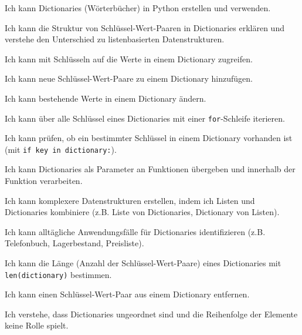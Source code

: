 \begin{todolist}
    \item Ich kann Dictionaries (Wörterbücher) in Python erstellen und verwenden.
    \item Ich kann die Struktur von Schlüssel-Wert-Paaren in Dictionaries erklären und verstehe den Unterschied zu listenbasierten Datenstrukturen.
    \item Ich kann mit Schlüsseln auf die Werte in einem Dictionary zugreifen.
    \item Ich kann neue Schlüssel-Wert-Paare zu einem Dictionary hinzufügen.
    \item Ich kann bestehende Werte in einem Dictionary ändern.
    \item Ich kann über alle Schlüssel eines Dictionaries mit einer \lstinline|for|-Schleife iterieren.
    \item Ich kann prüfen, ob ein bestimmter Schlüssel in einem Dictionary vorhanden ist (mit \lstinline|if key in dictionary:|).
    \item Ich kann Dictionaries als Parameter an Funktionen übergeben und innerhalb der Funktion verarbeiten.
    \item Ich kann komplexere Datenstrukturen erstellen, indem ich Listen und Dictionaries kombiniere (z.B. Liste von Dictionaries, Dictionary von Listen).
    \item Ich kann alltägliche Anwendungsfälle für Dictionaries identifizieren (z.B. Telefonbuch, Lagerbestand, Preisliste).
    \item Ich kann die Länge (Anzahl der Schlüssel-Wert-Paare) eines Dictionaries mit \lstinline|len(dictionary)| bestimmen.
    \item Ich kann einen Schlüssel-Wert-Paar aus einem Dictionary entfernen.
    \item Ich verstehe, dass Dictionaries ungeordnet sind und die Reihenfolge der Elemente keine Rolle spielt.
\end{todolist}

